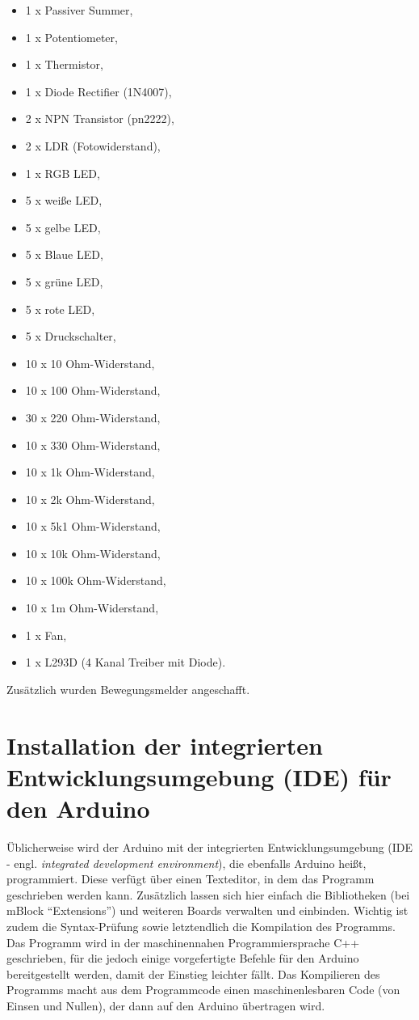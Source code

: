\begin{multicols}{2}
\begin{itemize}
		\item 1 x Passiver Summer,
		\item 1 x Potentiometer,
		\item 1 x Thermistor,
		\item 1 x Diode Rectifier (1N4007),
		\item 2 x NPN Transistor (pn2222),
		\item 2 x LDR (Fotowiderstand),
		\item 1 x RGB LED,
		\item 5 x weiße LED,
		\item 5 x gelbe LED,
		\item 5 x Blaue LED,
		\item 5 x grüne LED,
		\item 5 x rote LED,
		\item 5 x Druckschalter,
		\item 10 x 10 Ohm-Widerstand,
		\item 10 x 100 Ohm-Widerstand,
		\item 30 x 220 Ohm-Widerstand,
		\item 10 x 330 Ohm-Widerstand,
		\item 10 x 1k Ohm-Widerstand,
		\item 10 x 2k Ohm-Widerstand,
		\item 10 x 5k1 Ohm-Widerstand,
		\item 10 x 10k Ohm-Widerstand,
		\item 10 x 100k Ohm-Widerstand,
		\item 10 x 1m Ohm-Widerstand,
		\item 1 x Fan,
		\item 1 x L293D (4 Kanal Treiber mit Diode).
	\end{itemize}
\end{multicols}

Zusätzlich wurden Bewegungsmelder angeschafft.

\section{Installation der integrierten Entwicklungsumgebung (IDE) für den Arduino}
\label{sec:install_ide}

Üblicherweise wird der Arduino mit der integrierten Entwicklungsumgebung (IDE - engl. \emph{integrated development environment}), die ebenfalls Arduino heißt, programmiert. Diese verfügt über einen Texteditor, in dem das Programm geschrieben werden kann. Zusätzlich lassen sich hier einfach die Bibliotheken (bei mBlock \enquote{Extensions}) und weiteren Boards verwalten und einbinden. Wichtig ist zudem die Syntax-Prüfung sowie letztendlich die Kompilation des Programms. Das Programm wird in der maschinennahen Programmiersprache C++ geschrieben, für die jedoch einige vorgefertigte Befehle für den Arduino bereitgestellt werden, damit der Einstieg leichter fällt. Das Kompilieren des Programms macht aus dem Programmcode einen maschinenlesbaren Code (von Einsen und Nullen), der dann auf den Arduino übertragen wird.

